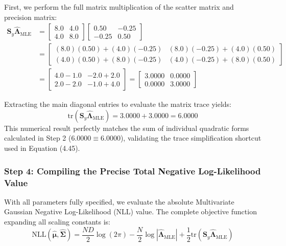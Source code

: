 \documentclass{article}
\begin{document}
First, we perform the full matrix multiplication of the scatter matrix and precision matrix:
\begin{align*}
\mathbf{S}_y \hat{\boldsymbol{\Lambda}}_{\text{MLE}} &= \begin{bmatrix} 8.0 & 4.0 \\ 4.0 & 8.0 \end{bmatrix} \begin{bmatrix} 0.50 & -0.25 \\ -0.25 & 0.50 \end{bmatrix} \\
&= \begin{bmatrix} (8.0)(0.50) + (4.0)(-0.25) & (8.0)(-0.25) + (4.0)(0.50) \\ (4.0)(0.50) + (8.0)(-0.25) & (4.0)(-0.25) + (8.0)(0.50) \end{bmatrix} \\
&= \begin{bmatrix} 4.0 - 1.0 & -2.0 + 2.0 \\ 2.0 - 2.0 & -1.0 + 4.0 \end{bmatrix} = \begin{bmatrix} \mathbf{3.0000} & 0.0000 \\ 0.0000 & \mathbf{3.0000} \end{bmatrix}
\end{align*}

Extracting the main diagonal entries to evaluate the matrix trace yields:
\begin{equation}
\text{tr}(\mathbf{S}_y \hat{\boldsymbol{\Lambda}}_{\text{MLE}}) = 3.0000 + 3.0000 = \mathbf{6.0000}
\end{equation}
This numerical result perfectly matches the sum of individual quadratic forms calculated in Step 2 ($\mathbf{6.0000} \equiv \mathbf{6.0000}$), validating the trace simplification shortcut used in Equation (4.45).

\subsubsection{Step 4: Compiling the Precise Total Negative Log-Likelihood Value}

With all parameters fully specified, we evaluate the absolute Multivariate Gaussian Negative Log-Likelihood ($\text{NLL}$) value. The complete objective function expanding all scaling constants is:
\begin{equation}
\text{NLL}(\hat{\boldsymbol{\mu}}, \hat{\boldsymbol{\Sigma}}) = \frac{ND}{2}\log(2\pi) - \frac{N}{2}\log|\hat{\boldsymbol{\Lambda}}_{\text{MLE}}| + \frac{1}{2}\text{tr}(\mathbf{S}_y \hat{\boldsymbol{\Lambda}}_{\text{MLE}})
\end{equation}
\end{document}
